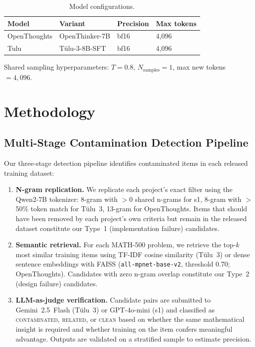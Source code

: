 \documentclass{article} %
\begin{document}
\begin{table}[h]
\centering
\caption{Model configurations.}
\label{tab:models}
\begin{tabular}{llll}
\toprule
\textbf{Model} & \textbf{Variant} & \textbf{Precision} & \textbf{Max tokens} \\
\midrule
OpenThoughts & OpenThinker-7B & bf16 & 4{,}096 \\
Tulu         & T\"ulu-3-8B-SFT & bf16 & 4{,}096 \\
\bottomrule
\end{tabular}
\end{table}

Shared sampling hyperparameters: $T = 0.8$, $N_{\text{samples}} = 1$, max new tokens $= 4{,}096$.

\section{Methodology}
\label{sec:method}

\subsection{Multi-Stage Contamination Detection Pipeline}

Our three-stage detection pipeline identifies contaminated items in each released training dataset:

\begin{enumerate}
    \item \textbf{N-gram replication.} We replicate each project's exact filter using the Qwen2-7B tokenizer: 8-gram with $>$0 shared n-grams for s1, 8-gram with $>$50\% token match for T\"ulu~3, 13-gram for OpenThoughts. Items that should have been removed by each project's own criteria but remain in the released dataset constitute our Type~1 (implementation failure) candidates.

    \item \textbf{Semantic retrieval.} For each MATH-500 problem, we retrieve the top-$k$ most similar training items using TF-IDF cosine similarity (T\"ulu~3) or dense sentence embeddings with FAISS (\texttt{all-mpnet-base-v2}, threshold 0.70; OpenThoughts). Candidates with zero n-gram overlap constitute our Type~2 (design failure) candidates.

    \item \textbf{LLM-as-judge verification.} Candidate pairs are submitted to Gemini~2.5~Flash (T\"ulu~3) or GPT-4o-mini (s1) and classified as \textsc{contaminated}, \textsc{related}, or \textsc{clean} based on whether the same mathematical insight is required and whether training on the item confers meaningful advantage. Outputs are validated on a stratified sample to estimate precision.
\end{enumerate}
\end{document}
